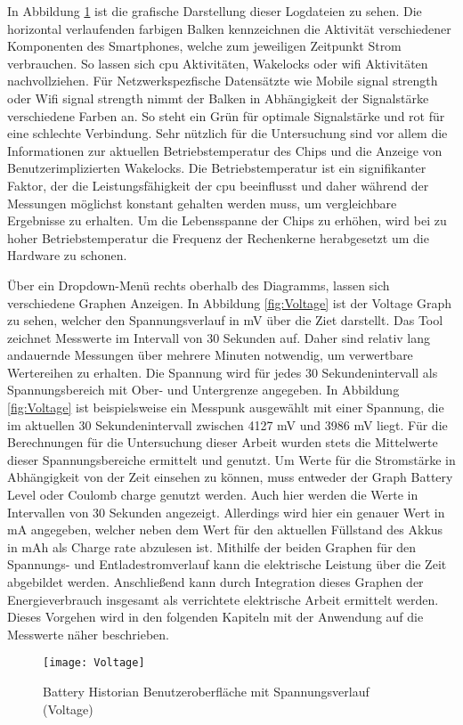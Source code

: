 In Abbildung \ref{fig:Voltage} ist die grafische Darstellung dieser Logdateien zu sehen. Die horizontal verlaufenden farbigen Balken kennzeichnen die Aktivität verschiedener Komponenten des Smartphones, welche zum jeweiligen Zeitpunkt Strom verbrauchen. So lassen sich \ac{cpu} Aktivitäten, Wakelocks oder \ac{wifi} Aktivitäten nachvollziehen. Für Netzwerkspezfische Datensätzte wie \glqq Mobile signal strength\grqq{} oder \glqq Wifi signal strength\grqq{} nimmt der Balken in Abhängigkeit der Signalstärke verschiedene Farben an. So steht ein Grün für optimale Signalstärke und rot für eine schlechte Verbindung. Sehr nützlich für die Untersuchung sind vor allem die Informationen zur aktuellen Betriebstemperatur des Chips und die Anzeige von Benutzerimplizierten Wakelocks. Die Betriebstemperatur ist ein signifikanter Faktor, der die Leistungsfähigkeit der \ac{cpu} beeinflusst und daher während der Messungen möglichst konstant gehalten werden muss, um vergleichbare Ergebnisse zu erhalten. Um die Lebensspanne der Chips zu erhöhen, wird bei zu hoher Betriebstemperatur die Frequenz der Rechenkerne herabgesetzt um die Hardware zu schonen.

Über ein Dropdown-Menü rechts oberhalb des Diagramms, lassen sich verschiedene Graphen Anzeigen. In Abbildung \autoref{fig:Voltage} ist der Voltage Graph zu sehen, welcher den Spannungsverlauf in \ac{mV} über die Ziet darstellt. Das Tool zeichnet Messwerte im Intervall von 30 Sekunden auf. Daher sind relativ lang andauernde Messungen über mehrere Minuten notwendig, um verwertbare Wertereihen zu erhalten. Die Spannung wird für jedes 30 Sekundenintervall als Spannungsbereich mit Ober- und Untergrenze angegeben. In Abbildung \autoref{fig:Voltage} ist beispielsweise ein Messpunk ausgewählt mit einer Spannung, die im aktuellen 30 Sekundenintervall zwischen 4127 \ac{mV} und 3986 \ac{mV} liegt. Für die Berechnungen für die Untersuchung dieser Arbeit wurden stets die Mittelwerte dieser Spannungsbereiche ermittelt und genutzt. Um Werte für die Stromstärke in Abhängigkeit von der Zeit einsehen zu können, muss entweder der Graph Battery Level oder Coulomb charge genutzt werden. Auch hier werden die Werte in Intervallen von 30 Sekunden angezeigt. Allerdings wird hier ein genauer Wert in \ac{mA} angegeben, welcher neben dem Wert für den aktuellen Füllstand des Akkus in \ac{mAh} als \glqq Charge rate\grqq{} abzulesen ist. Mithilfe der beiden Graphen für den Spannungs- und Entladestromverlauf kann die elektrische Leistung über die Zeit abgebildet werden. Anschließend kann durch Integration dieses Graphen der Energieverbrauch insgesamt als verrichtete elektrische Arbeit ermittelt werden. Dieses Vorgehen wird in den folgenden Kapiteln mit der Anwendung auf die Messwerte näher beschrieben.
\begin{figure}
\begin{center}
	\texttt{[image: Voltage]}
	\caption{Battery Historian Benutzeroberfläche mit Spannungsverlauf (Voltage)}
	\label{fig:Voltage} 
\end{center}
\end{figure}
